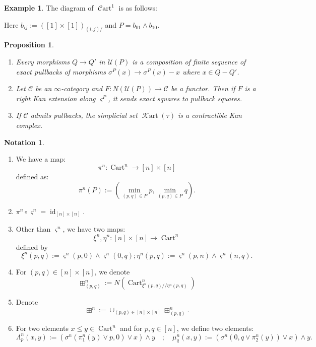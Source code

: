 \documentclass[14pt]{article}
\newtheorem{proposition}[theorem]{Proposition}
\theoremstyle{definition}
\newtheorem{example}[theorem]{Example}
\newtheorem{notation}[theorem]{Notation}
\newcommand{\K}{\mathcal{K}}
\newcommand{\op}[1]{\operatorname{#1}}
\newcommand{\C}{\mathcal{C}}
\newcommand{\U}{\mathcal{U}}
\newcommand{\Ca}{\mathcal{C}}
\numberwithin{subsection}{section}
\renewcommand{\U}{\mathcal{U}}
\newcommand{\Crt}{\op{Cart}}
\newcommand{\Cart}{\op{\C art}}
\newcommand{\Krt}{\op{\K art}}
\begin{document}
\begin{example}
    	 The diagram of $\Cart^1$ is as follows:
			\begin{center}
			\end{center}
			Here $b_{ij}:= ([1] \times [1])_{(i,j)/}$ and $P = b_{01} \wedge b_{10}$. 
\end{example}
\begin{proposition}
    \begin{enumerate}
        \item  Every morphisms $ Q \to Q'$ in $\U(P)$ is a composition of finite sequence of exact pullbacks of morphisms $ \sigma^P(x) \to \sigma^P(x)-x$ where $x \in Q -Q'$.
        \item 	Let $\Ca$ be an $\infty$-category and $F: N(\U(P)) \to \Ca$ be a functor. Then if $F$ is a right Kan extension along $\varsigma^P$, it sends exact squares to pullback squares. 
        \item If $\Ca$ admits pullbacks, the simplicial set $\Krt(\tau)$ is a contractible Kan complex. 

    \end{enumerate}
\end{proposition}

\begin{notation}
    \begin{enumerate}
			\item We have a map:\[\pi^n : \Crt^n \to [n] \times [n] \] defined as: 
			\[ \pi^n(P):= (\op{min}_{(p,q) \in P}p,\op{min}_{(p,q)\in P}q). \]
			\item $\pi^n \circ \varsigma^n = \op{id}_{[n]\times[n]}$.
			\item Other than $\varsigma^n$, we have two maps: \[ \xi^n,\eta^n: [n] \times [n] \to \Crt^n \] defined by 
			\[\xi^n(p,q):= \varsigma^n(p,0)\wedge \varsigma^n(0,q) ; \eta^n(p,q):= \varsigma^n(p,n)\wedge\varsigma^n(n,q).\]
			\item For $(p,q) \in [n] \times [n]$, we denote \[ \boxplus^n_{(p,q)}:= N(\Crt^n_{\xi^n(p,q)//\eta^n(p,q)}) \]
			\item Denote 
			\[ \boxplus^n:= \cup_{(p,q)\in [n] \times [n]} \boxplus^n_{(p,q)}. \]
			\item  For two elements $x\le y \in \op{Cart}^n$ and for $p,q \in [n]$, we define two elements:
         \begin{equation}
             \Lambda_p^n(x,y) := (\sigma^n(\pi^n_1(y) \vee p,0) \vee x) \wedge y \quad ; \quad \mu_q^n(x,y) := (\sigma^n(0,q \vee \pi^n_2(y)) \vee x) \wedge y.
         \end{equation}
			
			
		\end{enumerate}
\end{notation}
\end{document}
